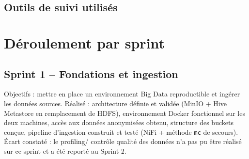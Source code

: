\documentclass[11pt,a4paper]{report}
\begin{document}
\subsection{Outils de suivi utilisés}

\section{Déroulement par sprint}

\subsection{Sprint 1 -- Fondations et ingestion}
\statutFait
Objectifs : mettre en place un environnement Big Data reproductible et
ingérer les données sources. Réalisé : architecture définie et validée
(MinIO + Hive Metastore en remplacement de HDFS), environnement Docker
fonctionnel sur les deux machines, accès aux données anonymisées obtenu,
structure des buckets conçue, pipeline d'ingestion construit et testé
(NiFi + méthode \texttt{mc} de secours). Écart constaté : le profiling/
contrôle qualité des données n'a pas pu être réalisé sur ce sprint et a été
reporté au Sprint 2.
\end{document}
